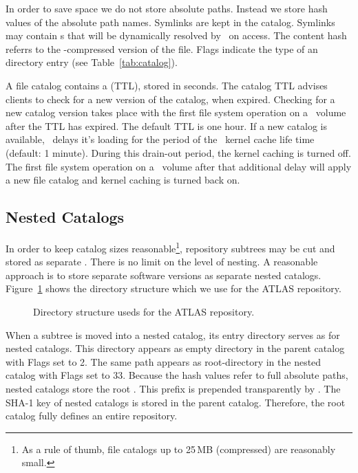 In order to save space we do not store absolute paths.
Instead we store  hash values of the absolute path names.
Symlinks are kept in the catalog.
Symlinks may contain s that will be dynamically resolved by \cvmfs\ on access.
The  content hash referrs to the -compressed version of the file.
Flags indicate the type of an directory entry (see Table~\ref{tab:catalog}).

A file catalog contains a  (TTL), stored in seconds.
The catalog TTL advises clients to check for a new version of the catalog, when expired.
Checking for a new catalog version takes place with the first file system operation on a \cvmfs\ volume after the TTL has expired.
The default TTL is one hour.
If a new catalog is available, \cvmfs\ delays it's loading for the period of the \cvmfs\ kernel cache life time (default: 1 minute).
During this drain-out period, the kernel caching is turned off.
The first file system operation on a \cvmfs\ volume after that additional delay will apply a new file catalog and kernel caching is turned back on.

\subsection{Nested Catalogs}
In order to keep catalog sizes reasonable\footnote{As a rule of thumb, file catalogs up to 25\,MB (compressed) are reasonably small.}, repository subtrees may be cut and stored as separate .
There is no limit on the level of nesting.
A reasonable approach is to store separate software versions as separate nested catalogs.
Figure~\ref{fig:nested} shows the directory structure which we use for the ATLAS repository.
\begin{figure}
	\begin{center}
		\framebox{}
	\end{center}
	\caption{Directory structure useds for the ATLAS repository.}
	\label{fig:nested}
\end{figure}

When a subtree is moved into a nested catalog, its entry directory serves as  for nested catalogs.
This directory appears as empty directory in the parent catalog with Flags set to 2.
The same path appears as root-directory in the nested catalog with Flags set to 33.
Because the  hash values refer to full absolute paths, nested catalogs store the root .
This prefix is prepended transparently by \cvmfs.
The SHA-1 key of nested catalogs is stored in the parent catalog.
Therefore, the root catalog fully defines an entire repository.

